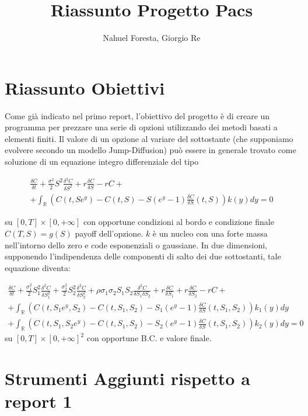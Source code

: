 \documentclass[a4paper,10pt]{article}
\title{Riassunto Progetto Pacs}
\author{Nahuel Foresta, Giorgio Re}
\newcommand{\der}[2]{\frac{\delta #1}{\delta #2}}
\newcommand{\dder}[2]{\frac{\delta^2 #1}{\delta #2^2}}
\newcommand{\dmix}[3]{\frac{\delta^2 #1}{\delta #2 \delta #3}}
\begin{document}
\maketitle

\section{Riassunto Obiettivi}

Come gi\`a indicato nel primo report, l'obiettivo del progetto è di creare un programma per prezzare una serie di opzioni utilizzando dei metodi basati a elementi finiti. Il valore di un opzione al variare del sottostante (che supponiamo evolvere secondo un modello Jump-Diffusion) può essere in generale trovato come soluzione di un equazione integro differenziale del tipo

\begin{multline}
\der{C}{t}+\frac{\sigma^2}{2}S^2\dder{C}{S}+r\der{C}{S}-rC+\\+ \int_\mathbb{R}\left(C(t,Se^y)-C(t,S)-S(e^y-1)\der{C}{S}(t,S)\right)k(y)dy=0
\end{multline}

su $[0,T]\times[0,+\infty]$ con opportune condizioni al bordo e condizione finale $C(T,S)=g(S)$ payoff dell'opzione. $k$ è un nucleo con una forte massa nell'intorno dello zero e code esponenziali o gaussiane.
In due dimensioni, supponendo l'indipendenza delle componenti di salto dei due sottostanti, tale equazione diventa:


\begin{multline}
 \der{C}{t}+\frac{\sigma_1^2}{2}S_1^2\dder{C}{S_1}+\frac{\sigma_2^2}{2}S_2^2\dder{C}{S_2}+\rho\sigma_1\sigma_2 S_1 S_2 \dmix{C}{S_1}{S_2}+
 r\der{C}{S_1}+r\der{C}{S_2}-rC+ \\
 + \int_\mathbb{R}\left(C(t,S_1e^{y},S_2)-C(t,S_1,S_2)-S_1(e^y-1)\der{C}{S}(t,S_1,S_2)\right)k_1(y)dy\\
 + \int_\mathbb{R}\left(C(t,S_1,S_2e^{y})-C(t,S_1,S_2)-S_2(e^y-1)\der{C}{S}(t,S_1,S_2)\right)k_2(y)dy=0 
\end{multline}
su $[0,T]\times[0,+\infty]^2$ con opportune B.C. e valore finale.

\section{Strumenti Aggiunti rispetto a report 1}
\end{document}
